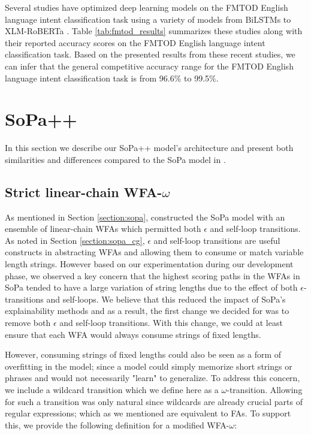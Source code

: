 \label{section:fmtod_performance}

Several studies have optimized deep learning models on the FMTOD English
language intent classification task using a variety of models from BiLSTMs to
XLM-RoBERTa
\citep{schuster-etal-2019-cross-lingual,zhang2019joint,zhang-etal-2020-intent}.
Table \ref{tab:fmtod_results} summarizes these studies along with their reported
accuracy scores on the FMTOD English language intent classification task. Based
on the presented results from these recent studies, we can infer that the
general competitive accuracy range for the FMTOD English language intent
classification task is from 96.6$\%$ to 99.5$\%$.

\section{SoPa++}

In this section we describe our SoPa++ model's architecture and present both
similarities and differences compared to the SoPa model in
\citet{schwartz2018sopa}.

\subsection{Strict linear-chain WFA-$\omega$}

As mentioned in Section \ref{section:sopa}, \citet{schwartz2018sopa}
constructed the SoPa model with an ensemble of linear-chain WFAs which permitted
both $\epsilon$ and self-loop transitions. As noted in Section
\ref{section:sopa_cg}, $\epsilon$ and self-loop transitions are useful
constructs in abstracting WFAs and allowing them to consume or match variable length
strings. However based on our experimentation during our development phase, we
observed a key concern that the highest scoring paths in the WFAs in SoPa tended
to have a large variation of string lengths due to the effect of both
$\epsilon$-transitions and self-loops. We believe that this reduced the impact of
SoPa's explainability methods and as a result, the first change we decided for
was to remove both $\epsilon$ and self-loop transitions. With this change, we could
at least ensure that each WFA would always consume strings of fixed lengths.

However, consuming strings of fixed lengths could also be seen as a form of
overfitting in the model; since a model could simply memorize short strings or
phrases and would not necessarily "learn" to generalize. To address this
concern, we include a wildcard transition which we define here as a
$\omega$-transition. Allowing for such a transition was only natural since
wildcards are already crucial parts of regular expressions; which as we
mentioned are equivalent to FAs. To support this, we provide the following
definition for a modified WFA-$\omega$:

